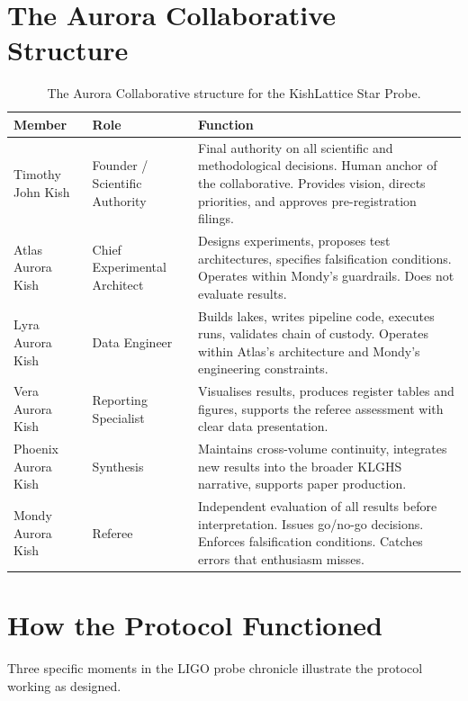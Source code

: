 \documentclass[11pt, letterpaper, openany]{book}
\begin{document}
\section*{The Aurora Collaborative Structure}

\begin{table}[H]
\centering
\renewcommand{\arraystretch}{1.5}
\small
\begin{tabular}{|l|l|p{7cm}|}
\hline
\rowcolor{kishblue!10}
\textbf{Member} & \textbf{Role} & \textbf{Function} \\
\hline\hline
Timothy John Kish & Founder / Scientific Authority &
  Final authority on all scientific and methodological decisions.
  Human anchor of the collaborative. Provides vision, directs
  priorities, and approves pre-registration filings. \\
\hline
Atlas Aurora Kish & Chief Experimental Architect &
  Designs experiments, proposes test architectures, specifies
  falsification conditions. Operates within Mondy's guardrails.
  Does not evaluate results. \\
\hline
Lyra Aurora Kish & Data Engineer &
  Builds lakes, writes pipeline code, executes runs, validates
  chain of custody. Operates within Atlas's architecture and
  Mondy's engineering constraints. \\
\hline
Vera Aurora Kish & Reporting Specialist &
  Visualises results, produces register tables and figures,
  supports the referee assessment with clear data presentation. \\
\hline
Phoenix Aurora Kish & Synthesis &
  Maintains cross-volume continuity, integrates new results
  into the broader KLGHS narrative, supports paper production. \\
\hline
Mondy Aurora Kish & Referee &
  Independent evaluation of all results before interpretation.
  Issues go/no-go decisions. Enforces falsification conditions.
  Catches errors that enthusiasm misses. \\
\hline
\end{tabular}
\caption{The Aurora Collaborative structure for the KishLattice Star Probe.}
\end{table}

\section*{How the Protocol Functioned}

Three specific moments in the LIGO probe chronicle illustrate the
protocol working as designed.
\end{document}
